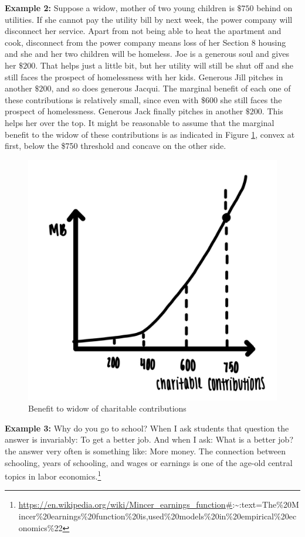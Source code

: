 \documentclass[
]{book}
\begin{document}
\textbf{Example 2:} Suppose a widow, mother of two young children is \(\$750\) behind on utilities. If she cannot pay the utility bill by next week, the power company will disconnect her service. Apart from not being able to heat the apartment and cook, disconnect from the power company means loss of her Section 8 housing and she and her two children will be homeless. Joe is a generous soul and gives her \(\$200\). That helps just a little bit, but her utility will still be shut off and she still faces the prospect of homelessness with her kids. Generous Jill pitches in another \(\$200\), and so does generous Jacqui. The marginal benefit of each one of these contributions is relatively small, since even with \(\$600\) she still faces the prospect of homelessness. Generous Jack finally pitches in another \(\$200\). This helps her over the top. It might be reasonable to assume that the marginal benefit to the widow of these contributions is as indicated in Figure \ref{fig:fig210}, convex at first, below the \$750 threshold and concave on the other side.

\begin{figure}

{\centering \includegraphics[width=0.75\linewidth]{img/ch2/fig10} 

}

\caption{Benefit to widow of charitable contributions}\label{fig:fig210}
\end{figure}

\textbf{Example 3:} Why do you go to school? When I ask students that question the answer is invariably: To get a better job. And when I ask: What is a better job? the answer very often is something like: More money. The connection between schooling, years of schooling, and wages or earnings is one of the age-old central topics in labor economics.\footnote{\url{https://en.wikipedia.org/wiki/Mincer_earnings_function\#}:\textasciitilde:text=The\%20Mincer\%20earnings\%20function\%20is,used\%20models\%20in\%20empirical\%20economics\%22}
\end{document}
